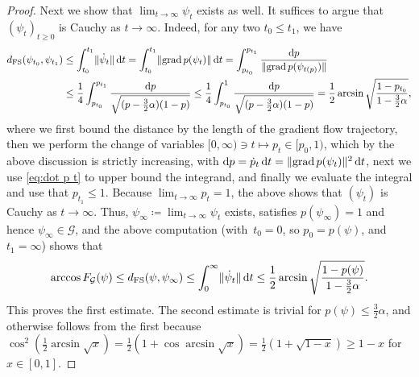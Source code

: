 \documentclass[11pt,a4paper]{article}
\numberwithin{equation}{section}
\newcommand{\dd}{\textrm{d}}
\newcommand{\GG}{\mathcal G}
\newcommand{\1}{\mathbf{1}}
\DeclareMathOperator{\grad}{grad}
\DeclarePairedDelimiter\norm{\lVert}{\rVert}
\begin{document}
\begin{proof}
Next we show that $\lim_{t\to\infty} \psi_t$ exists as well.
It suffices to argue that $(\psi_t)_{t\geq0}$ is Cauchy as $t\to\infty$.
Indeed, for any two $t_0 \leq t_1$, we have
\begin{align*}
    d_{\mathrm{FS}}(\psi_{t_0}, \psi_{t_1})
&\leq \int_{t_0}^{t_1} \norm{\dot\psi_t} \, \dd t
= \int_{t_0}^{t_1} \norm{\grad p(\psi_t)} \, \dd t
= \int_{p_{t_0}}^{p_{t_1}} \frac{\dd p}{\norm{\grad p(\psi_{t(p)})}} \\
&\leq \frac14 \int_{p_{t_0}}^{p_{t_1}} \frac{\dd p}{\sqrt{(p - \frac32\alpha)(1 - p)}}
\leq \frac14 \int_{p_{t_0}}^1 \frac{\dd p}{\sqrt{(p - \frac32\alpha)(1 - p)}}
= \frac12 \arcsin\sqrt{\frac{1-p_{t_0}}{1-\frac32\alpha}},
\end{align*}
where we first bound the distance by the length of the gradient flow trajectory, then we perform the change of variables $[0,\infty) \ni t \mapsto p_t \in [p_0,1)$, which by the above discussion is strictly increasing, with $\dd p = \dot p_t \, \dd t = \norm{\grad p(\psi_t)}^2 \, \dd t$, next we use \cref{eq:dot p t} to upper bound the integrand, and finally we evaluate the integral and use that $p_{t_1} \leq 1$.
Because $\lim_{t\to\infty} p_t=1$, the above shows that $(\psi_t)$ is Cauchy as $t\to\infty$.
Thus, $\psi_\infty \coloneqq \lim_{t\to\infty} \psi_t$ exists, satisfies $p(\psi_\infty)=1$ and hence $\psi_\infty \in \GG$, and the above computation (with~$t_0=0$, so $p_0 = p(\psi)$, and $t_1=\infty$) shows that
\begin{align*}
\arccos F_{\GG}(\psi)
\leq d_{\mathrm{FS}}(\psi, \psi_\infty)
\leq \int_0^\infty \norm{\dot\psi_t} \, \dd t
\leq \frac12 \arcsin\sqrt{\frac{1-p(\psi)}{1-\frac32\alpha}}.
\end{align*}
This proves the first estimate.
The second estimate is trivial for $p(\psi) \leq \frac32\alpha$, and otherwise follows from the first because $\cos^2(\frac12\arcsin\sqrt{x}) = \frac12 (1 + \cos\arcsin\sqrt{x}) = \frac12 (1 + \sqrt{1 - x}) \geq 1 - x$ for $x\in[0,1]$.
\end{proof}

\end{document}
